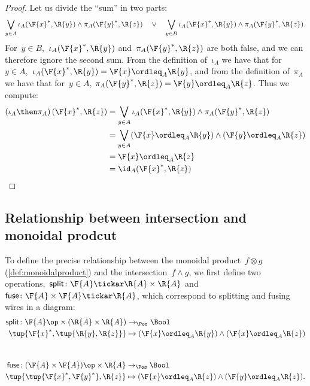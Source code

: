 \begin{proof}
    Let us divide the ``sum'' in two parts:
    \begin{equation}
    \bigvee_{y \in A} \iota_A(\F{x}^*,\R{y}) \wedge \pi_A(\F{y}^*,\R{z}) \quad\vee\quad
    \bigvee_{y \in B} \iota_A(\F{x}^*,\R{y}) \wedge \pi_A(\F{y}^*,\R{z}).
    \end{equation}
    For~$y \in B$,~$\iota_A(\F{x}^*,\R{y})$ and~$\pi_A(\F{y}^*,\R{z})$ are both false, and we can therefore ignore the second sum.
    From the definition of~$\iota_A$ we have that for~$y\in A$,~$ \iota_A(\F{x}^*,\R{y})=\F{x} \ordleq_A \R{y}$, and from the definition of~$\pi_A$ we have that for~$y\in A$, $\pi_A(\F{y}^*,\R{z})=\F{y} \ordleq_A \R{z}$. Thus we compute:
\begin{equation}
    \begin{aligned}
    \left(\iota_A\then \pi_A\right)(\F{x}^*, \R{z}) &= \bigvee_{y \in A} \iota_A(\F{x}^*,\R{y}) \wedge \pi_A(\F{y}^*,\R{z})  \\
     &= \bigvee_{y \in A} (\F{x} \ordleq_A \R{y}) \wedge  (\F{y} \ordleq_A \R{z}) \\
     &= \F{x} \ordleq_A \R{z}\\
     &= \id_A(\F{x}^*, \R{z})
\end{aligned}
\end{equation}
\end{proof}

\subsection{Relationship between intersection and monoidal prodcut}
To define the precise relationship between the monoidal product~$f \otimes g$ (\cref{def:monoidalproduct}) and the intersection~$f \wedge g$, we first define two operations,~$\mathsf{split} \colon \F{A} \tickar \R{A} \times \R{A}$ and~$\mathsf{fuse} \colon \F{A} \times \F{A} \tickar \R{A}$, which correspond to splitting and fusing wires in a diagram:
\begin{equation}
\begin{aligned}
    \mathsf{split} \colon \F{A}\op \times (\R{A} \times \R{A}) &\to_\Pos \Bool \\
    \tup{\F{x}^*, \tup{\R{y}, \R{z}}} &\mapsto (\F{x} \ordleq_A \R{y}) \wedge (\F{x} \ordleq_A \R{z})
\end{aligned}
\end{equation}
~
\begin{equation}
\begin{aligned}
    \mathsf{fuse} \colon (\F{A} \times \F{A})\op \times \R{A} &\to_\Pos \Bool \\
    \tup{ \tup{\F{x}^*, \F{y}^*}, \R{z}} &\mapsto (\F{x} \ordleq_A \R{z}) \wedge (\F{y} \ordleq_A \R{z}).
\end{aligned}
\end{equation}

